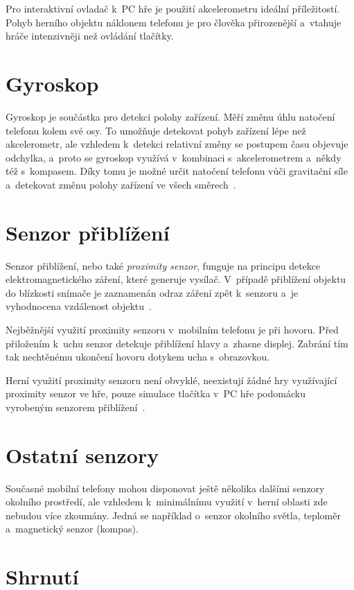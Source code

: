 \documentclass[thesis=B,czech,hidelinks]{FITthesis}[2012/06/26] %
\begin{document}
Pro interaktivní ovladač k~PC hře je použití akcelerometru ideální příležitostí. Pohyb herního objektu náklonem telefonu je pro člověka přirozenější a~vtahuje hráče intenzivněji než ovládání tlačítky. 

\section{Gyroskop}

Gyroskop je součástka pro detekci polohy zařízení. Měří změnu úhlu natočení telefonu kolem své osy. To umožňuje detekovat pohyb zařízení lépe než akcelerometr, ale vzhledem k~detekci relativní změny se postupem času objevuje odchylka, a~proto se gyroskop využívá v~kombinaci s~akcelerometrem a~někdy též s~kompasem. Díky tomu je možné určit natočení telefonu vůči gravitační síle a~detekovat změnu polohy zařízení ve všech směrech~\cite{gyroscope}.

\section{Senzor přiblížení}

Senzor přiblížení, nebo také \textit{proximity senzor}, funguje na principu detekce elektromagnetického záření, které generuje vysílač. V~případě přiblížení objektu do blízkosti snímače je zaznamenán odraz záření zpět k~senzoru a~je vyhodnocena vzdálenost objektu~\cite{proximity}.

Nejběžnější využití proximity senzoru v~mobilním telefonu je při hovoru. Před přiložením k~uchu senzor detekuje přiblížení hlavy a~zhasne displej. Zabrání tím tak nechtěnému ukončení hovoru dotykem ucha s~obrazovkou.

Herní využití proximity senzoru není obvyklé, neexistují žádné hry využívající proximity senzor ve hře, pouze simulace tlačítka v~PC hře podomácku vyrobeným senzorem přiblížení~\cite{proximitygame}.

\section{Ostatní senzory}

Současné mobilní telefony mohou disponovat ještě několika dalšími senzory okolního prostředí, ale vzhledem k~minimálnímu využití v~herní oblasti zde nebudou více zkoumány. Jedná se například o~senzor okolního světla, teploměr a~magnetický senzor (kompas). 

\section{Shrnutí}
\end{document}
